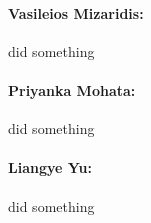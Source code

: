\documentclass[10pt]{article}
\begin{document}
\paragraph{Vasileios Mizaridis:}
did something

\paragraph{Priyanka Mohata:}
did something

\paragraph{Liangye Yu:}
did something

\newpage


\end{document}
